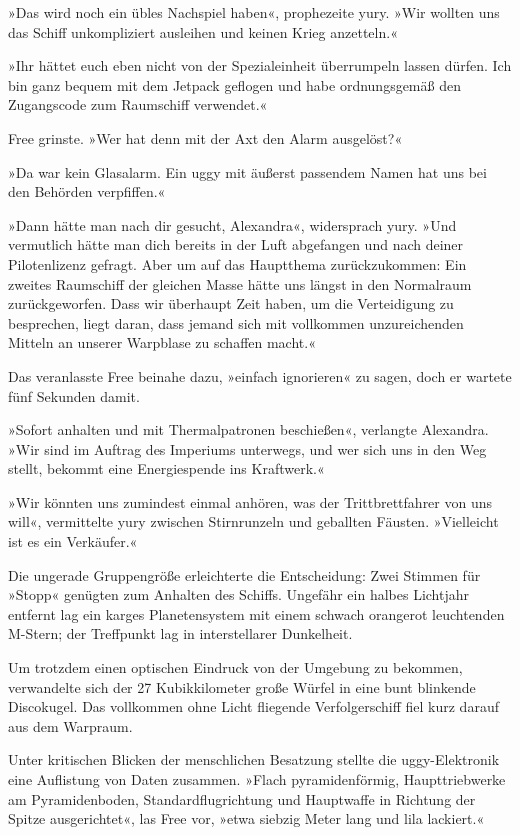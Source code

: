 »Das wird noch ein übles Nachspiel haben«, prophezeite yury. »Wir wollten uns das Schiff unkompliziert ausleihen und keinen Krieg anzetteln.«

»Ihr hättet euch eben nicht von der Spezialeinheit überrumpeln lassen dürfen. Ich bin ganz bequem mit dem Jetpack geflogen und habe ordnungsgemäß den Zugangscode zum Raumschiff verwendet.«

Free grinste. »Wer hat denn mit der Axt den Alarm ausgelöst?«

»Da war kein Glasalarm. Ein uggy mit äußerst passendem Namen hat uns bei den Behörden verpfiffen.«

»Dann hätte man nach dir gesucht, Alexandra«, widersprach yury. »Und vermutlich hätte man dich bereits in der Luft abgefangen und nach deiner Pilotenlizenz gefragt. Aber um auf das Hauptthema zurückzukommen: Ein zweites Raumschiff der gleichen Masse hätte uns längst in den Normalraum zurückgeworfen. Dass wir überhaupt Zeit haben, um die Verteidigung zu besprechen, liegt daran, dass jemand sich mit vollkommen unzureichenden Mitteln an unserer Warpblase zu schaffen macht.«

Das veranlasste Free beinahe dazu, »einfach ignorieren« zu sagen, doch er wartete fünf Sekunden damit.

»Sofort anhalten und mit Thermalpatronen beschießen«, verlangte Alexandra. »Wir sind im Auftrag des Imperiums unterwegs, und wer sich uns in den Weg stellt, bekommt eine Energiespende ins Kraftwerk.«

»Wir könnten uns zumindest einmal anhören, was der Trittbrettfahrer von uns will«, vermittelte yury zwischen Stirnrunzeln und geballten Fäusten. »Vielleicht ist es ein Verkäufer.«

Die ungerade Gruppengröße erleichterte die Entscheidung: Zwei Stimmen für »Stopp« genügten zum Anhalten des Schiffs. Ungefähr ein halbes Lichtjahr entfernt lag ein karges Planetensystem mit einem schwach orangerot leuchtenden M-Stern; der Treffpunkt lag in interstellarer Dunkelheit.

Um trotzdem einen optischen Eindruck von der Umgebung zu bekommen, verwandelte sich der 27 Kubikkilometer große Würfel in eine bunt blinkende Discokugel. Das vollkommen ohne Licht fliegende Verfolgerschiff fiel kurz darauf aus dem Warpraum.

Unter kritischen Blicken der menschlichen Besatzung stellte die uggy-Elektronik eine Auflistung von Daten zusammen. »Flach pyramidenförmig, Haupttriebwerke am Pyramidenboden, Standardflugrichtung und Hauptwaffe in Richtung der Spitze ausgerichtet«, las Free vor, »etwa siebzig Meter lang und lila lackiert.«

